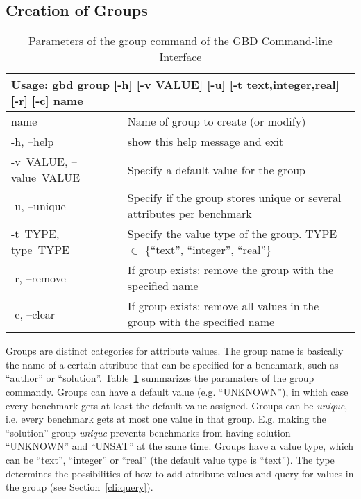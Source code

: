 \documentclass{easychair}
\begin{document}
\subsection{Creation of Groups}
\label{cli:group}

\begin{table}[ht]
\begin{tabular}{p{.17\linewidth}|p{.73\linewidth}}
\multicolumn{2}{l}{\bf Usage: \textsf{gbd group [-h] [-v VALUE] [-u] [-t {text,integer,real}] [-r] [-c] name}}\\

\hline
  \sf name                  &Name of group to create (or modify)\\

  \sf -h, --help            &show this help message and exit\\
  \sf \mbox{-v VALUE}, \mbox{--value VALUE}
                        &Specify a default value for the group\\
  \sf -u, --unique          &Specify if the group stores unique or several
                        attributes per benchmark\\
  \sf \mbox{-t TYPE}, \mbox{--type TYPE}
                        &Specify the value type of the group. 
                        \textsf{TYPE $\in$ \{``text'', ``integer'', ``real''\}}\\
  \sf -r, --remove          &If group exists: remove the group with the specified
                        name\\
  \sf -c, --clear           &If group exists: remove all values in the group with
                        the specified name
\end{tabular}
\caption{Parameters of the group command of the GBD Command-line Interface}
\label{fig:cli:group}
\end{table}

Groups are distinct categories for attribute values. 
The group name is basically the name of a certain attribute that can be specified for a benchmark, 
such as ``author'' or ``solution''.
Table~\ref{fig:cli:group} summarizes the paramaters of the group commandy. 
Groups can have a default value (e.g. ``UNKNOWN''), in which case every benchmark gets at least the default value assigned.
Groups can be \emph{unique}, i.e. every benchmark gets at most one value in that group.
E.g. making the ``solution'' group \emph{unique} prevents benchmarks from having solution ``UNKNOWN'' and ``UNSAT'' at the same time.
Groups have a value type, which can be ``text'', ``integer'' or ``real'' (the default value type is ``text'').
The type determines the possibilities of how to add attribute values and query for values in the group (see Section~\ref{cli:query}).
\end{document}
